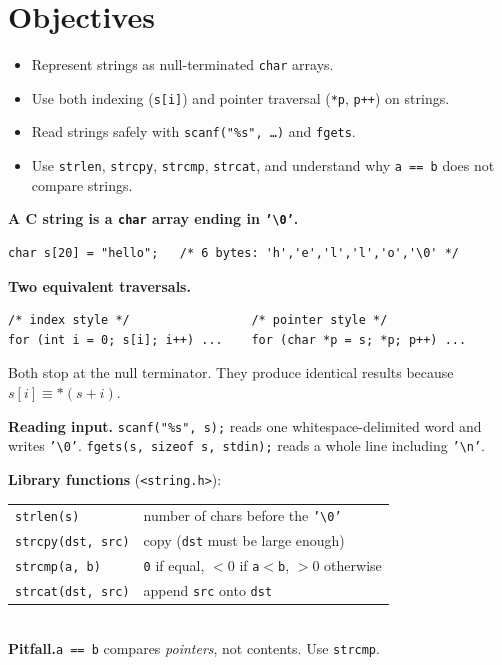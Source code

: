 \documentclass[11pt]{article}
\begin{document}
\labheader

\section*{Objectives}
\begin{itemize}[leftmargin=*,nosep]
  \item Represent strings as null-terminated \texttt{char} arrays.
  \item Use both indexing (\texttt{s[i]}) and pointer traversal (\texttt{*p}, \texttt{p++}) on strings.
  \item Read strings safely with \texttt{scanf("\%s", \dots)} and \texttt{fgets}.
  \item Use \texttt{strlen}, \texttt{strcpy}, \texttt{strcmp}, \texttt{strcat}, and understand why \texttt{a == b} does not compare strings.
\end{itemize}

\begin{summary}
\textbf{A C string is a \texttt{char} array ending in \texttt{'\textbackslash 0'}.}
\begin{lstlisting}
char s[20] = "hello";   /* 6 bytes: 'h','e','l','l','o','\0' */
\end{lstlisting}

\textbf{Two equivalent traversals.}
\begin{lstlisting}
/* index style */                 /* pointer style */
for (int i = 0; s[i]; i++) ...    for (char *p = s; *p; p++) ...
\end{lstlisting}
Both stop at the null terminator. They produce identical results because
\(s[i] \equiv *(s + i)\).

\textbf{Reading input.}\quad
\texttt{scanf("\%s", s);} reads one whitespace-delimited word and writes \texttt{'\textbackslash 0'}.
\texttt{fgets(s, sizeof s, stdin);} reads a whole line including \texttt{'\textbackslash n'}.

\textbf{Library functions} (\texttt{<string.h>}):\\
\begin{tabular}{@{}ll@{}}
\toprule
\texttt{strlen(s)} & number of chars before the \texttt{'\textbackslash 0'} \\
\texttt{strcpy(dst, src)} & copy (\texttt{dst} must be large enough) \\
\texttt{strcmp(a, b)} & \texttt{0} if equal, $<0$ if \texttt{a}$<$\texttt{b}, $>0$ otherwise \\
\texttt{strcat(dst, src)} & append \texttt{src} onto \texttt{dst} \\
\bottomrule
\end{tabular}\\[2pt]
\textbf{Pitfall.}\quad \texttt{a == b} compares \emph{pointers}, not contents. Use \texttt{strcmp}.
\end{summary}
\end{document}
